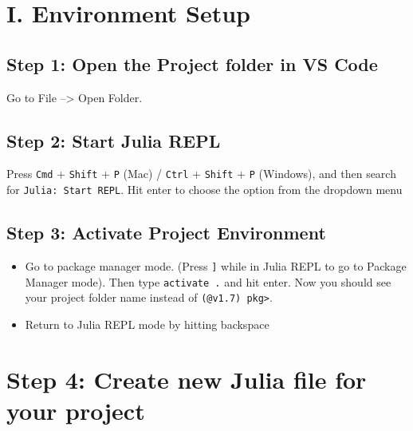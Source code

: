 \documentclass[
  letterpaper,
]{book}
\providecommand{\tightlist}{%
  \setlength{\itemsep}{0pt}\setlength{\parskip}{0pt}}\usepackage{longtable,booktabs,array}
\begin{document}
\hypertarget{i.-environment-setup}{%
\section*{I. Environment Setup}\label{i.-environment-setup}}

\hypertarget{step-1-open-the-project-folder-in-vs-code}{%
\subsection*{\texorpdfstring{Step 1: Open the \textbf{Project} folder in
VS
Code}{Step 1: Open the Project folder in VS Code}}\label{step-1-open-the-project-folder-in-vs-code}}

Go to File --\textgreater{} Open Folder.

\hypertarget{step-2-start-julia-repl}{%
\subsection*{Step 2: Start Julia REPL}\label{step-2-start-julia-repl}}

Press \texttt{Cmd} + \texttt{Shift} + \texttt{P} (Mac) / \texttt{Ctrl} +
\texttt{Shift} + \texttt{P} (Windows), and then search for
\texttt{Julia:\ Start\ REPL}. Hit enter to choose the option from the
dropdown menu

\hypertarget{step-3-activate-project-environment}{%
\subsection*{Step 3: Activate Project
Environment}\label{step-3-activate-project-environment}}

\begin{itemize}
\tightlist
\item
  Go to package manager mode. (Press \texttt{{]}} while in Julia REPL to
  go to Package Manager mode). Then type \texttt{activate\ .} and hit
  enter. Now you should see your project folder name instead of
  \texttt{(@v1.7)\ pkg\textgreater{}}.
\item
  Return to Julia REPL mode by hitting backspace
\end{itemize}

\hypertarget{step-4-create-new-julia-file-for-your-project}{%
\section*{Step 4: Create new Julia file for your
project}\label{step-4-create-new-julia-file-for-your-project}}
\end{document}
